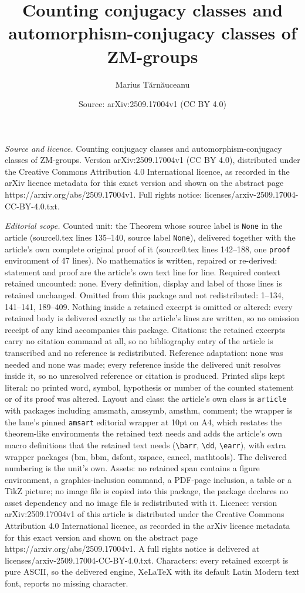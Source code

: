 \documentclass[10pt,a4paper]{amsart}
\title[Counting conjugacy classes and automorphism-conjugacy classe]{Counting conjugacy classes and automorphism-conjugacy classes of ZM-groups}
\author{Marius T\u{a}rn\u{a}uceanu}
\date{Source: arXiv:2509.17004v1 (CC BY 4.0)}
\begin{document}
\maketitle

\noindent\emph{Source and licence.} Counting conjugacy classes and automorphism-conjugacy classes of ZM-groups. Version arXiv:2509.17004v1 (CC BY 4.0), distributed under the Creative Commons Attribution 4.0 International licence, as recorded in the arXiv licence metadata for this exact version and shown on the abstract page https://arxiv.org/abs/2509.17004v1. Full rights notice: licenses/arxiv-2509.17004-CC-BY-4.0.txt.\par\smallskip

\noindent\textit{Editorial scope.} Counted unit: the Theorem whose source label is \texttt{None} in the article (source0.tex lines 135--140, source label \texttt{None}), delivered together with the article's own complete original proof of it (source0.tex lines 142--188, one \texttt{proof} environment of 47 lines). No mathematics is written, repaired or re-derived: statement and proof are the article's own text line for line. Required context retained uncounted: none. Every definition, display and label of those lines is retained unchanged. Omitted from this package and not redistributed: 1--134, 141--141, 189--409. Nothing inside a retained excerpt is omitted or altered: every retained body is delivered exactly as the article's lines are written, so no omission receipt of any kind accompanies this package. Citations: the retained excerpts carry no citation command at all, so no bibliography entry of the article is transcribed and no reference is redistributed. Reference adaptation: none was needed and none was made; every reference inside the delivered unit resolves inside it, so no unresolved reference or citation is produced. Printed slips kept literal: no printed word, symbol, hypothesis or number of the counted statement or of its proof was altered. Layout and class: the article's own class is \texttt{article} with packages including amsmath, amssymb, amsthm, comment; the wrapper is the lane's pinned \texttt{amsart} editorial wrapper at 10pt on A4, which restates the theorem-like environments the retained text needs and adds the article's own macro definitions that the retained text needs (\texttt{\textbackslash barr}, \texttt{\textbackslash dd}, \texttt{\textbackslash earr}), with extra wrapper packages (bm, bbm, dsfont, xspace, cancel, mathtools). The delivered numbering is the unit's own. Assets: no retained span contains a figure environment, a graphics-inclusion command, a PDF-page inclusion, a table or a TikZ picture; no image file is copied into this package, the package declares no asset dependency and no image file is redistributed with it. Licence: version arXiv:2509.17004v1 of this article is distributed under the Creative Commons Attribution 4.0 International licence, as recorded in the arXiv licence metadata for this exact version and shown on the abstract page https://arxiv.org/abs/2509.17004v1. A full rights notice is delivered at licenses/arxiv-2509.17004-CC-BY-4.0.txt. Characters: every retained excerpt is pure ASCII, so the delivered engine, XeLaTeX with its default Latin Modern text font, reports no missing character.
\end{document}
